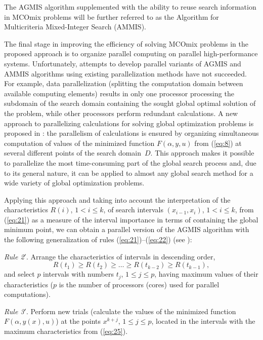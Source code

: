 \documentclass{svproc}
\begin{document}
The AGMIS algorithm supplemented with the ability to reuse search information in MCOmix problems will be further referred to as the Algorithm for Multicriteria Mixed-Integer Search (AMMIS).

The final stage in improving the efficiency of solving MCOmix problems in the proposed approach is to organize parallel computing on parallel high-performance systems. Unfortunately, attempts to develop parallel variants of AGMIS and AMMIS algorithms using existing parallelization methods have not succeeded. For example, data parallelization (splitting the computation domain between available computing elements) results in only one processor processing the subdomain of the search domain containing the sought global optimal solution of the problem, while other processors perform redundant calculations.  A new approach to parallelizing calculations for solving global optimization problems is proposed in \cite{c24,c32}: the parallelism of calculations is ensured by organizing simultaneous computation of values of the minimized function $F(\alpha,y,u)$ from (\ref{eq:8}) at several different points of the search domain~$D$. This approach makes it possible to parallelize the most time-consuming part of the global search process and, due to its general nature, it can be applied to almost any global search method for a wide variety of global optimization problems.

Applying this approach and taking into account the interpretation of the characteristics $R(i)$, $1<i \leq k$, of search intervals $(x_{i-1}, x_i)$, $1<i \leq k$, from (\ref{eq:21}) as a measure of the interval importance in terms of containing the global minimum point, we can obtain a parallel version of the AGMIS algorithm with the following generalization of rules (\ref{eq:21})--(\ref{eq:22}) (see \cite{c32,c40}):

\textit{Rule 2$'$}. Arrange the characteristics of intervals in descending order,
\begin{equation}\label{eq:25}
 R(t_1) \geq R(t_2) \geq \dots \geq R(t_{k-2}) \geq R(t_{k-1}),
\end{equation}
and select $p$ intervals with numbers $t_j$, $1 \leq j \leq p$, having maximum values of their characteristics ($p$ is the number of processors (cores) used for parallel computations).

\textit{Rule 3$'$}. Perform new trials (calculate the values of the minimized function $F(\alpha,y(x),u)$) at the points $x^{k+j}$, $1 \leq j \leq p$, located in the intervals with the maximum characteristics from (\ref{eq:25}).
\end{document}
